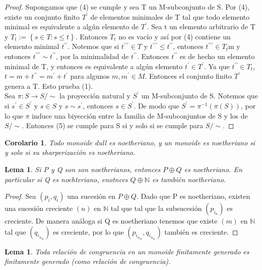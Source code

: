 \documentclass[12pt,spanish]{amsart}
\newcommand{\bb}[1]{\mathbb{#1}}
\newcommand{\set}[1]{\left\{{#1}\right\}}
\newtheorem{lem}[Theorem]{Lema}
\newtheorem{cor}[Theorem]{Corolario}
\theoremstyle{definition}
\theoremstyle{remark}
\begin{document}
\begin{proof}
Supongamos que (4) se cumple y sea T un M-subconjunto de S. Por (4), existe un conjunto finito $T^{\prime}$ de elementos minimales de T tal que todo elemento minimal es equivalente a algún elemento de $T^{\prime}$. Sea t un elemento arbitrario de T y $T_{t}:=\set{s\in T:s\leq t}$. Entonces $T_{t}$ no es vacío y así por (4) contiene un elemento minimal $t^{\prime \prime}$. Notemos que si $t^{\prime \prime \prime}\in T$ y $t^{\prime \prime \prime}\leq t^{\prime \prime}$, entonces $t^{\prime \prime \prime}\in T_{t}$m y entonces $t^{\prime \prime \prime} \sim t^{\prime \prime}$, por la minimalidad de $t^{\prime \prime}$. Entonces $t^{\prime \prime}$ es de hecho un elemento minimal de T, y entonces es equivalente a algún elemento $t^{\prime}\in T^{\prime}$. Ya que $t^{\prime \prime} \in T_{t}$, $t=m+t^{\prime \prime}= m^{\prime}+t^{\prime}$ para algunos $m,m^{\prime}\in M$. Entonces el conjunto finito $T^{\prime}$ genera a T. Esto prueba (1). \\
Sea $\pi:S \to S/ \sim$ la proyección natural y $S^{\prime}$ un M-subconjunto de S. Notemos que si $s^{\prime}\in S^{\prime}$ y $s\in S$ y $s\sim s^{\prime}$, entonces $s\in S^{\prime}$. De modo que $S^{\prime}=\pi^{-1}(\pi(S))$, por lo que $\pi$ induce una biyección entre la familia de M-subconjuntos de S y los de $S/ \sim$. Entonces (5) se cumple para S si y solo si se cumple para $S/ \sim$.  
\end{proof}

\begin{cor}
Todo monoide \textit{dull} es noetheriano, y un monoide es noetheriano si y solo si su \textit{sharp}erización es noetheriano.  
\end{cor}


\begin{lem}
Si P y Q son son noetherianos, entonces $P \oplus Q$ es noetheriano. En particular si Q es noehteriano, enotnces $Q \oplus \bb{N}$ es también noetheriano. 
\end{lem}

\begin{proof}
Sea $(p_{i},q_{i})$ una sucesión en $P\oplus Q$. Dado que P es noetheriano, existen una sucesión creciente $(n)$ en $\bb{N}$ tal que tal que la subsucesión $(p_{i_{n}})$ es creciente. De manera análoga si Q es noetheriano tenemos que existe $(m)$ en $\bb{N}$ tal que $(q_{i_{n_{m}}})$ es creciente, por lo que $(p_{i_{n_{m}}},q_{i_{n_{m}}})$ también es creciente. 
\end{proof}


\begin{lem}
Toda relación de congruencia en un monoide finitamente generado es finitamente generado (como relación de congruencia). 
\end{lem}
\end{document}
